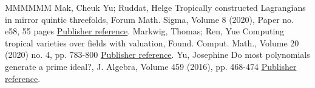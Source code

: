 \begin{thebibliography}{MMMMMM}
 Mak, Cheuk Yu; Ruddat, Helge Tropically constructed Lagrangians in mirror quintic threefolds, Forum Math. Sigma, Volume 8 (2020), Paper no. e58, 55 pages \href{https://alco.centre-mersenne.org/articles/10.5802/alco.327/#MakRuddat20}{Publisher reference}.
 Markwig, Thomas; Ren, Yue Computing tropical varieties over fields with valuation, Found. Comput. Math., Volume 20 (2020) no. 4, pp. 783-800 \href{https://alco.centre-mersenne.org/articles/10.5802/alco.327/#MR20}{Publisher reference}.
 Yu, Josephine Do most polynomials generate a prime ideal?, J. Algebra, Volume 459 (2016), pp. 468-474 \href{https://alco.centre-mersenne.org/articles/10.5802/alco.327/#Yu16}{Publisher reference}.
\end{thebibliography}
